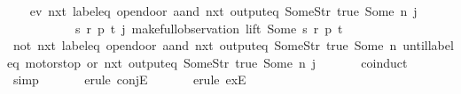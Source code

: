 \begin{isabellebody}
{}%
%
\isadelimproof
%
\endisadelimproof
%
\isatagproof
{}\isamarkupfalse%
{\isacharminus}\isanewline
\ \ \isacommand{{\isacharbraceleft}}\isamarkupfalse%
\isamarkupfalse%
\ {\isachardoublequoteopen}{\isacharparenleft}ev\ {\isacharparenleft}nxt\ {\isacharparenleft}{\isacharparenleft}label{\isacharunderscore}eq\ {\isacharprime}{\isacharprime}opendoor{\isacharprime}{\isacharprime}{\isacharparenright}\ aand\ {\isacharparenleft}nxt\ {\isacharparenleft}output{\isacharunderscore}eq\ {\isacharbrackleft}Some{\isacharparenleft}Str\ {\isacharprime}{\isacharprime}true{\isacharprime}{\isacharprime}{\isacharparenright}{\isacharcomma}\ Some\ n{\isacharbrackright}{\isacharparenright}{\isacharparenright}{\isacharparenright}{\isacharparenright}{\isacharparenright}\ j\ {\isasymand}\isanewline
\ \ \ \ \ \ \ \ \ \ \ {\isacharparenleft}{\isasymexists}s\ r\ p\ t{\isachardot}\ j{\isacharequal}\ make{\isacharunderscore}full{\isacharunderscore}observation\ lift\ {\isacharparenleft}Some\ s{\isacharparenright}\ r\ p\ t{\isacharparenright}{\isachardoublequoteclose}\isanewline
\ \ \ \isamarkupfalse%
\ {\isachardoublequoteopen}{\isacharparenleft}{\isacharparenleft}not\ {\isacharparenleft}nxt\ {\isacharparenleft}label{\isacharunderscore}eq\ {\isacharprime}{\isacharprime}opendoor{\isacharprime}{\isacharprime}\ aand\ {\isacharparenleft}nxt\ {\isacharparenleft}output{\isacharunderscore}eq\ {\isacharbrackleft}Some{\isacharparenleft}Str\ {\isacharprime}{\isacharprime}true{\isacharprime}{\isacharprime}{\isacharparenright}{\isacharcomma}\ Some\ n{\isacharbrackright}{\isacharparenright}{\isacharparenright}{\isacharparenright}{\isacharparenright}{\isacharparenright}\ until{\isacharparenleft}{\isacharparenleft}{\isacharparenleft}label{\isacharunderscore}eq\ {\isacharprime}{\isacharprime}motorstop{\isacharprime}{\isacharprime}{\isacharparenright}\ or\ {\isacharparenleft}nxt\ {\isacharparenleft}output{\isacharunderscore}eq\ {\isacharbrackleft}Some{\isacharparenleft}Str\ {\isacharprime}{\isacharprime}true{\isacharprime}{\isacharprime}{\isacharparenright}{\isacharcomma}\ Some\ n{\isacharbrackright}{\isacharparenright}{\isacharparenright}{\isacharparenright}{\isacharparenright}{\isacharparenright}\ j{\isachardoublequoteclose}\isanewline
\ \ \ \ \ \isamarkupfalse%
\ coinduct\isanewline
\ \ \ \ \ \isamarkupfalse%
\ simp\isanewline
\ \ \ \ \ \isamarkupfalse%
\ {\isacharparenleft}erule\ conjE{\isacharparenright}\isanewline
\ \ \ \ \ \isamarkupfalse%
\ {\isacharparenleft}erule\ exE{\isacharparenright}{\isacharplus}\isanewline

\end{isabellebody}
